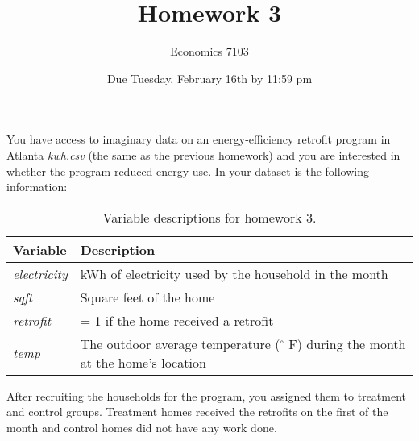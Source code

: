 \documentclass{article}
\title{Homework 3}
\author{Economics 7103}
\date{Due Tuesday, February 16th by 11:59 pm}
\begin{document}
  
\maketitle

\noindent You have access to imaginary data on an energy-efficiency retrofit program in Atlanta \textit{kwh.csv} (the same as the previous homework) and you are interested in whether the program reduced energy use.  In your dataset is the following information:
\begin{table}[h]
    \centering
    \begin{tabular}{l|l}
        Variable & Description \\ \hline
         \textit{electricity} & kWh of electricity used by the household in the month  \\
         \textit{sqft} & Square feet of the home \\
         \textit{retrofit} & = 1 if the home received a retrofit \\
         \textit{temp} & The outdoor average temperature ($^\circ$ F) during the month at the home's location \\
    \end{tabular}
    \caption{Variable descriptions for homework 3.}
    \label{tab:variables}
\end{table}
After recruiting the households for the program, you assigned them to treatment and control groups.  Treatment homes received the retrofits on the first of the month and control homes did not have any work done.
\end{document}
